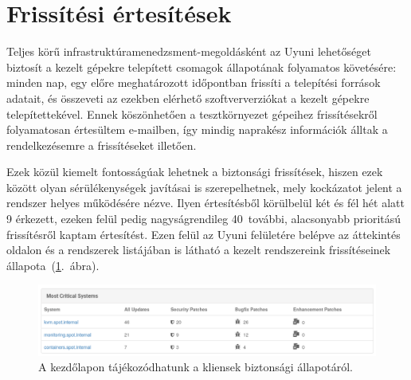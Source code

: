 \section{Frissítési értesítések}
Teljes körű infrastruktúramenedzsment-megoldásként az Uyuni lehetőséget biztosít a kezelt gépekre telepített csomagok állapotának folyamatos követésére: minden nap, egy előre meghatározott időpontban frissíti a telepítési források adatait, és összeveti az ezekben elérhető szoftververziókat a kezelt gépekre telepítettekével. Ennek köszönhetően a tesztkörnyezet gépeihez  frissítésekről folyamatosan értesültem e-mailben, így mindig naprakész információk álltak a rendelkezésemre a frissítéseket illetően.

Ezek közül kiemelt fontosságúak lehetnek a biztonsági frissítések, hiszen ezek között olyan sérülékenységek javításai is szerepelhetnek, mely kockázatot jelent a rendszer helyes működésére nézve. Ilyen értesítésből körülbelül két és fél hét alatt 9 érkezett, ezeken felül pedig nagyságrendileg 40~további, alacsonyabb prioritású frissítésről kaptam értesítést. Ezen felül az Uyuni felületére belépve az áttekintés oldalon és a rendszerek listájában is látható a kezelt rendszereink frissítéseinek állapota~(\ref{fig:uyuni-security-status}.~ábra).

\begin{figure}[ht]
	\centering
	\includegraphics[width=15cm]{figures/uyuni-security-status.png}
	\caption{A kezdőlapon tájékozódhatunk a kliensek biztonsági állapotáról.}
	\label{fig:uyuni-security-status}
\end{figure}